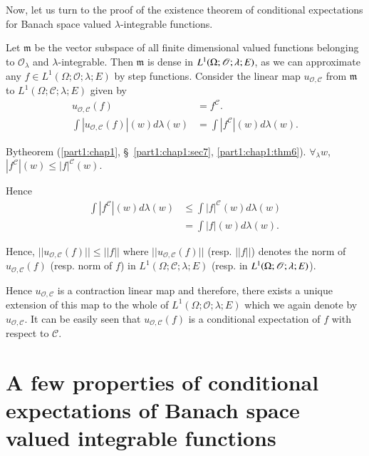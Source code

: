 Now, let us turn to the proof of the existence theorem of conditional
expectations for Banach space valued $\lambda$-integrable functions. 

Let $\mathfrak{m}$ be the vector subspace of all finite dimensional
valued functions belonging to $\hat{\mathscr{O}}_\lambda$ and
$\lambda$-integrable. Then $\mathfrak{m}$ is dense in $L^1(\Omega;
\mathscr{O};\break \lambda; E)$, as we can approximate any $f \in
L^1(\Omega; \mathscr{O}; \lambda; E)$ by step functions. Consider the
linear map $u_{\mathscr{O}, \mathscr{C}}$ from $\mathfrak{m}$ to
$L^1(\Omega; \mathscr{C}; \lambda; E)$ given by 
\begin{align*}
u_{\mathscr{O}, \mathscr{C}} (f) & = f^\mathscr{C}. \\
\int |u_{\mathscr{O}, \mathscr{C}} (f)| (w) d \lambda (w) & = \int
|f^\mathscr{C}| (w) d \lambda(w). 
\end{align*}

By\pageoriginale theorem (\ref{part1:chap1},
\S\ \ref{part1:chap1:sec7}, \ref{part1:chap1:thm6}). $\forall_\lambda
w$, 
$|f^\mathscr{C}| (w) \leq |f|^\mathscr{C} (w)$. 

Hence
\begin{align*}
\int |f^\mathscr{C}| (w) d \lambda (w) & \leq \int |f|^\mathscr{C} (w)
d \lambda (w)\\
& = \int |f| (w) d \lambda (w). 
\end{align*}

Hence, $||u_{\mathscr{O}, \mathscr{C}} (f)|| \leq ||f||$ where
$||u_{\mathscr{O}, \mathscr{C}} (f)||$ (resp. $||f||$) denotes the
norm of $u_{\mathscr{O}, \mathscr{C}} (f)$ (resp. norm of $f$) in $L^1
(\Omega; \mathscr{C}; \lambda; E)$ (resp. in $L^1 (\Omega;
\mathscr{O};\break \lambda; E)$). 

Hence $u_{\mathscr{O}, \mathscr{C}}$ is a contraction linear map and
therefore, there exists a unique extension of this map to the whole of
$L^1 (\Omega; \mathscr{O}; \lambda; E)$ which we again denote by
$u_{\mathscr{O}, \mathscr{C}}$. It can be easily seen that
$u_{\mathscr{O}, \mathscr{C}} (f)$ is a conditional expectation of $f$
with respect to $\mathscr{C}$. 

\section[A few properties of conditional...]{A few properties of conditional 
expectations of Banach space valued integrable functions}\label{part1:chap1:sec8}

